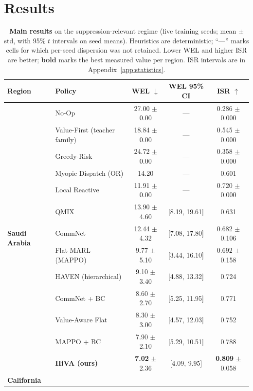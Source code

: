 \documentclass[letterpaper]{article}
\begin{document}
\section{Results}
\label{sec:results}

\begin{table}[t]
\centering
\caption{\textbf{Main results} on the suppression-relevant regime (five training seeds; mean $\pm$ std, with 95\% $t$ intervals on seed means). Heuristics are deterministic; ``---'' marks cells for which per-seed dispersion was not retained. Lower WEL and higher ISR are better; \textbf{bold} marks the best measured value per region. ISR intervals are in Appendix~\ref{app:statistics}.}
\label{tab:main_results}
\vspace{0.4em}
\footnotesize
\begin{tabular}{llccc}
	\toprule
	Region & Policy & WEL $\downarrow$ & WEL 95\% CI & ISR $\uparrow$ \\
	\midrule
	\multirow{13}{*}{\textbf{Saudi Arabia}}
	& No-Op & 27.00 $\pm$ 0.00 & --- & 0.286 $\pm$ 0.000 \\
	& Value-First (teacher family) & 18.84 $\pm$ 0.00 & --- & 0.545 $\pm$ 0.000 \\
	& Greedy-Risk & 24.72 $\pm$ 0.00 & --- & 0.358 $\pm$ 0.000 \\
	& Myopic Dispatch (OR) & 14.20 & --- & 0.601 \\
	& Local Reactive & 11.91 $\pm$ 0.00 & --- & 0.720 $\pm$ 0.000 \\
	& QMIX & 13.90 $\pm$ 4.60 & [8.19, 19.61] & 0.631 \\
	& CommNet & 12.44 $\pm$ 4.32 & [7.08, 17.80] & 0.682 $\pm$ 0.106 \\
	& Flat MARL (MAPPO) & 9.77 $\pm$ 5.10 & [3.44, 16.10] & 0.692 $\pm$ 0.158 \\
	& HAVEN (hierarchical) & 9.10 $\pm$ 3.40 & [4.88, 13.32] & 0.724 \\
	& CommNet + BC & 8.60 $\pm$ 2.70 & [5.25, 11.95] & 0.771 \\
	& Value-Aware Flat & 8.30 $\pm$ 3.00 & [4.57, 12.03] & 0.752 \\
	& MAPPO + BC & 7.90 $\pm$ 2.10 & [5.29, 10.51] & 0.788 \\
	& \textbf{HiVA (ours)} & \textbf{7.02} $\pm$ 2.36 & [4.09, 9.95] & \textbf{0.809} $\pm$ 0.058 \\
	\midrule
	\multirow{13}{*}{\textbf{California}}

\end{tabular}
\end{table}
\end{document}
